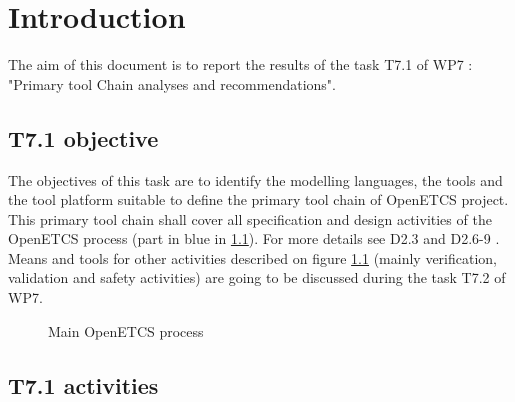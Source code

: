 

\chapter{Introduction}
\label{sec:intro}


The aim of this document is to report the results of the task T7.1 of WP7 :  "Primary tool Chain analyses and recommendations".


\section{T7.1 objective}

The objectives of this task are to identify the modelling languages, the tools and the tool platform suitable to define the primary tool chain of OpenETCS project. This primary tool chain shall  cover all specification and design activities of the OpenETCS process (part in blue in \ref{fig:main_process}). For more details see D2.3 \citep{D2_3} and D2.6-9 \citep{D2_6}. Means and tools for other activities described on figure \ref{fig:main_process} (mainly verification, validation and safety activities)  are going to be discussed during the task T7.2 of WP7.


 \begin{figure}
  \centering
  \caption{Main OpenETCS process}
  \label{fig:main_process}
\end{figure}

\section{T7.1 activities}

